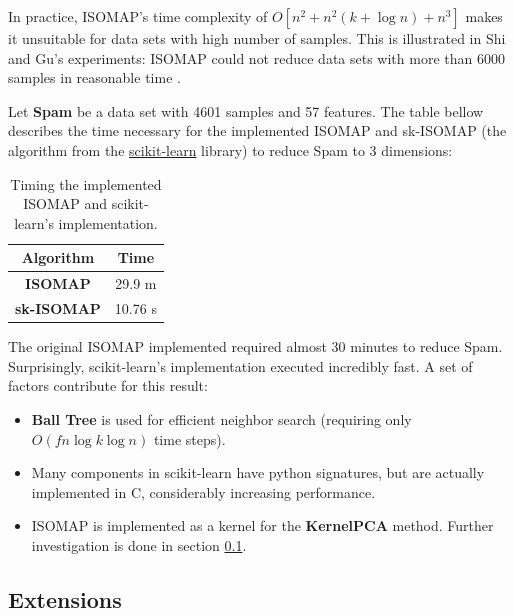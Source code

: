 In practice, ISOMAP's time complexity of $O[n^2 + n^2(k + \log n) + n^3]$ makes it unsuitable for data sets with high number of samples. This is illustrated in Shi and Gu's experiments: ISOMAP could not reduce data sets with more than 6000 samples in reasonable time \cite{shi2012fast}.

\begin{experiment}
	Let \textbf{Spam} be a data set with 4601 samples and 57 features. The table bellow describes the time necessary for the implemented ISOMAP and sk-ISOMAP (the algorithm from the \href{http://scikit-learn.org}{scikit-learn} library) to reduce Spam to 3 dimensions:

	\begin{table}[H]
		\centering
		\begin{tabular}{|c|c|}
			\hline
			\textbf{Algorithm} & Time \\\hline
			\textbf{ISOMAP} & 29.9 m \\\hline
			\textbf{sk-ISOMAP} & 10.76 s \\\hline
		\end{tabular}

		\caption{Timing the implemented ISOMAP and scikit-learn's implementation.}
	\end{table}

	The original ISOMAP implemented required almost 30 minutes to reduce Spam.
	Surprisingly, scikit-learn's implementation executed incredibly fast. A set of factors contribute for this result:

	\begin{itemize}
		\item \textbf{Ball Tree} is used for efficient neighbor search (requiring only $O(f n \log k \log n)$ time steps).
		\item Many components in scikit-learn have python signatures, but are actually implemented in C, considerably increasing performance.
		\item ISOMAP is implemented as a kernel for the \textbf{KernelPCA} method. Further investigation is done in section \ref{sec:ISOMAP_extensions}.
	\end{itemize}

\end{experiment}

\subsection{Extensions}
\label{sec:ISOMAP_extensions}

